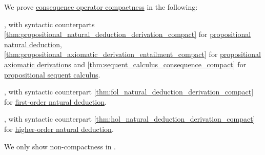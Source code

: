 \begin{remark}\label{rem:logical_compactness_theorems}
  We prove \hyperref[def:consequence_operator/compactness]{consequence operator compactness} in the following:
  \begin{thmenum}
     , with syntactic counterparts \cref{thm:propositional_natural_deduction_derivation_compact} for \hyperref[def:propositional_natural_deduction]{propositional natural deduction}, \cref{thm:propositional_axiomatic_derivation_entailment_compact} for \hyperref[def:propositional_axiomatic_derivation_system]{propositional axiomatic derivations} and \cref{thm:sequent_calculus_consequence_compact} for \hyperref[def:classical_propositional_sequent_calculus]{propositional sequent calculus}.

     , with syntactic counterpart \cref{thm:fol_natural_deduction_derivation_compact} for \hyperref[def:fol_natural_deduction_proof_tree]{first-order natural deduction}.

     , with syntactic counterpart \cref{thm:hol_natural_deduction_derivation_compact} for \hyperref[def:hol_natural_deduction_proof_tree]{higher-order natural deduction}.
  \end{thmenum}
\end{remark}
\begin{comments}
  \item We only show non-compactness in .
\end{comments}

